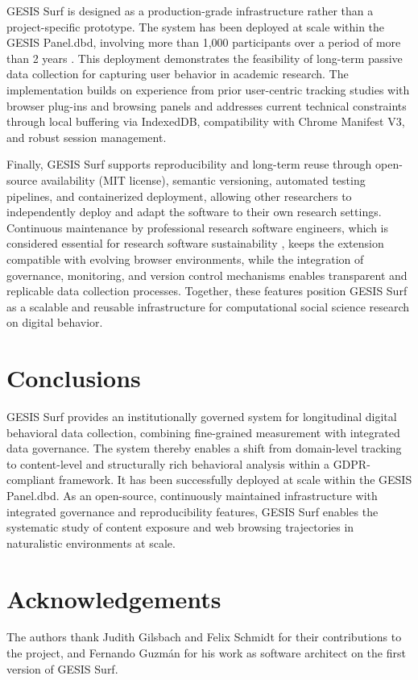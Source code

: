 \documentclass[preprint,12pt,a4paper]{elsarticle}
\begin{document}
GESIS Surf is designed as a production-grade infrastructure rather than a project-specific prototype. The system has been deployed at scale within the GESIS Panel.dbd, involving more than 1,000 participants over a period of more than 2 years \cite{gilsbach2025incentives, gesis2025panel}. This deployment demonstrates the feasibility of long-term passive data collection for capturing user behavior in academic research. The implementation builds on experience from prior user-centric tracking studies with browser plug-ins and browsing panels \cite{breuer2023facebook, stier2022postbroadcast, haim2019computational} and addresses current technical constraints through local buffering via IndexedDB, compatibility with Chrome Manifest V3, and robust session management.

Finally, GESIS Surf supports reproducibility and long-term reuse through open-source availability (MIT license), semantic versioning, automated testing pipelines, and containerized deployment, allowing other researchers to independently deploy and adapt the software to their own research settings. Continuous maintenance by professional research software engineers, which is considered essential for research software sustainability \cite{anzt2021rse}, keeps the extension compatible with evolving browser environments, while the integration of governance, monitoring, and version control mechanisms enables transparent and replicable data collection processes. Together, these features position GESIS Surf as a scalable and reusable infrastructure for computational social science research on digital behavior.

  \section{Conclusions}

GESIS Surf provides an institutionally governed system for longitudinal digital behavioral data collection, combining fine-grained measurement with integrated data governance. The system thereby enables a shift from domain-level tracking to content-level and structurally rich behavioral analysis within a GDPR-compliant framework. It has been successfully deployed at scale within the GESIS Panel.dbd. As an open-source, continuously maintained infrastructure with integrated governance and reproducibility features, GESIS Surf enables the systematic study of content exposure and web browsing trajectories in naturalistic environments at scale.

  \section*{Acknowledgements}
  The authors thank Judith Gilsbach and Felix Schmidt for their contributions to the
  project, and Fernando Guzm\'an for his work as software architect on the first version
  of GESIS Surf.
\end{document}
